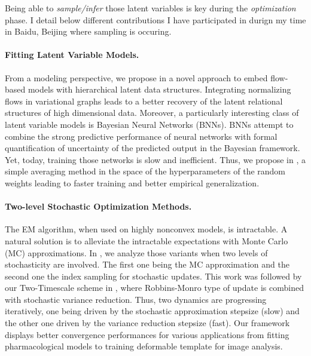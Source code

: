 \documentclass[twoside,11pt]{article}
\begin{document}
\vspace{0.2in}
\textbf{\scalebox{1.6}{(b) When Sampling meets Optimization}}
\vspace{0.2in}

Being able to \emph{sample/infer} those latent variables is key during the \emph{optimization} phase.
I detail below different contributions I have participated in durign my time in Baidu, Beijing where sampling is occuring.

\vspace{0.08in}
\paragraph{Fitting Latent Variable Models.} 
From a modeling perspective, we propose in \citep{ren2020vfg} a novel approach to embed flow-based models with hierarchical latent data structures. 
Integrating normalizing flows in variational graphs leads to a better recovery of the latent relational structures of high dimensional data.
Moreover, a particularly interesting class of latent variable models is Bayesian Neural Networks (BNNs).
BNNs attempt to combine the strong predictive performance of neural networks with formal quantification of uncertainty of the predicted output in the Bayesian framework.
Yet, today, training those networks is slow and inefficient. 
Thus, we propose in \citep{karimi2020hwa}, a simple averaging method in the space of the hyperparameters of the random weights leading to faster training and better empirical generalization.



\vspace{0.08in}
\paragraph{Two-level Stochastic Optimization Methods.} 
The EM algorithm, when used on highly nonconvex models, is intractable.
A natural solution is to alleviate the intractable expectations with Monte Carlo (MC) approximations.
In \citep{karimi2020misso}, we analyze those variants when two levels of stochasticity are involved.
The first one being the MC approximation and the second one the index sampling for stochastic updates.
This work was followed by our Two-Timescale scheme in \citep{karimi2020tts}, where Robbins-Monro type of update is combined with stochastic variance reduction.
Thus, two dynamics are progressing iteratively, one being driven by the stochastic approximation stepsize (slow) and the other one driven by the variance reduction stepsize (fast).
Our framework displays better convergence performances for various applications from fitting pharmacological models to training deformable template for image analysis.
\end{document}
